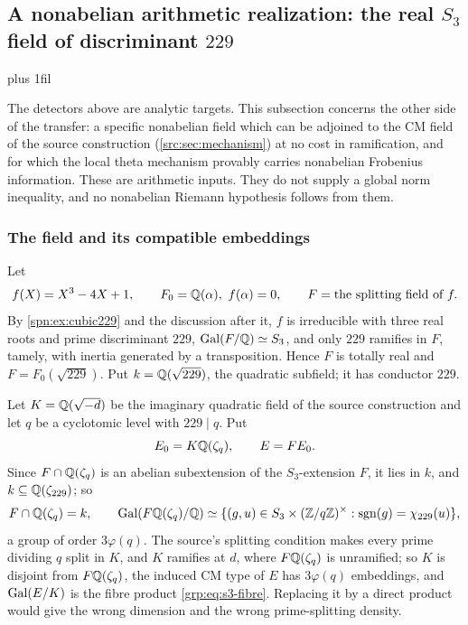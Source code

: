 \subsection{A nonabelian arithmetic realization: the real \texorpdfstring{$S_3$}{S3} field of discriminant \texorpdfstring{$229$}{229}}
\label{grp:sec:s3}
{\rightskip=0pt plus 1fil\relax
{}
}

The detectors above are analytic targets. This subsection concerns the other
side of the transfer: a specific nonabelian field which can be adjoined to the
CM field of the source construction (\cref{src:sec:mechanism}) at no cost in
ramification, and for which the local theta mechanism provably carries
nonabelian Frobenius information. These are arithmetic inputs. They do not
supply a global norm inequality, and no nonabelian Riemann hypothesis follows
from them.

\subsubsection{The field and its compatible embeddings}
Let
\[
 f(X)=X^3-4X+1,\qquad F_0=\mathbb{Q}(\alpha),\ f(\alpha)=0,\qquad
 F=\text{the splitting field of }f .
\]
By \cref{spn:ex:cubic229} and the discussion after it, $f$ is irreducible with three
real roots and prime discriminant $229$, $\operatorname{Gal}(F/\mathbb{Q})\simeq S_3$, and only $229$ ramifies
in $F$, tamely, with inertia generated by a transposition. Hence $F$ is totally real and
$F=F_0(\sqrt{229})$. Put
$k=\mathbb{Q}(\sqrt{229})$, the quadratic subfield; it has conductor $229$.

Let $K=\mathbb{Q}(\sqrt{-d})$ be the imaginary quadratic field of the source
construction and let $q$ be a cyclotomic level with $229\mid q$. Put
\[
 E_0=K\mathbb{Q}(\zeta_q),\qquad E=FE_0 .
\]
Since $F\cap\mathbb{Q}(\zeta_q)$ is an abelian subextension of the $S_3$-extension
$F$, it lies in $k$, and $k\subseteq\mathbb{Q}(\zeta_{229})$; so
\begin{equation}\label{grp:eq:s3-fibre}
 F\cap\mathbb{Q}(\zeta_q)=k,\qquad
 \operatorname{Gal}(F\mathbb{Q}(\zeta_q)/\mathbb{Q})\simeq
 \{(g,u)\in S_3\times(\mathbb{Z}/q\mathbb{Z})^\times:\operatorname{sgn}(g)=\chi_{229}(u)\},
\end{equation}
a group of order $3\varphi(q)$. The source's splitting condition makes every
prime dividing $q$ split in $K$, and $K$ ramifies at $d$, where
$F\mathbb{Q}(\zeta_q)$ is unramified; so $K$ is disjoint from $F\mathbb{Q}(\zeta_q)$, the
induced CM type of $E$ has $3\varphi(q)$ embeddings, and $\operatorname{Gal}(E/K)$ is the
fibre product \eqref{grp:eq:s3-fibre}. Replacing it by a direct product would
give the wrong dimension and the wrong prime-splitting density.

